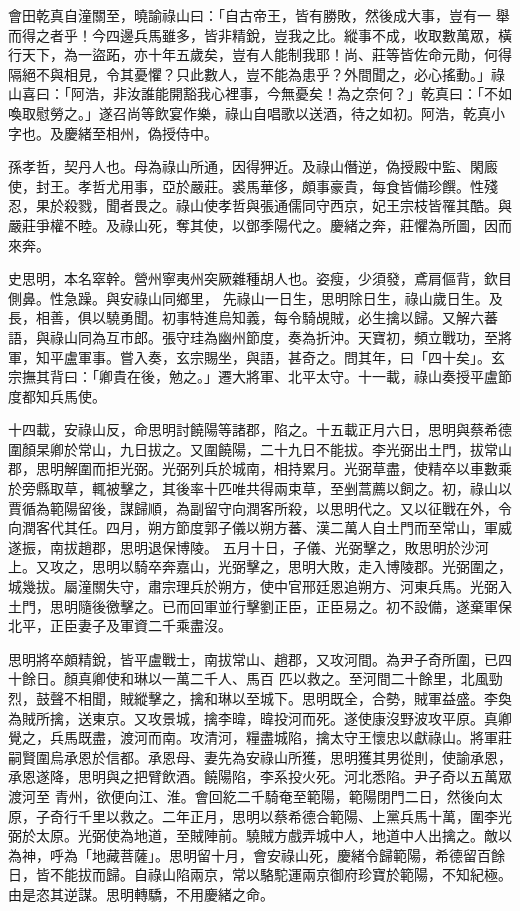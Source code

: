\begin{pinyinscope}
 會田乾真自潼關至，曉諭祿山曰：「自古帝王，皆有勝敗，然後成大事，豈有一
 舉而得之者乎！今四邊兵馬雖多，皆非精銳，豈我之比。縱事不成，收取數萬眾，橫行天下，為一盜跖，亦十年五歲矣，豈有人能制我耶！尚、莊等皆佐命元勛，何得隔絕不與相見，令其憂懼？只此數人，豈不能為患乎？外間聞之，必心搖動。」祿山喜曰：「阿浩，非汝誰能開豁我心裡事，今無憂矣！為之奈何？」乾真曰：「不如喚取慰勞之。」遂召尚等飲宴作樂，祿山自唱歌以送酒，待之如初。阿浩，乾真小字也。及慶緒至相州，偽授侍中。



 孫孝哲，契丹人也。母為祿山所通，因得狎近。及祿山僭逆，偽授殿中監、閑廄使，封王。孝哲尤用事，亞於嚴莊。裘馬華侈，頗事豪貴，每食皆備珍饌。性殘忍，果於殺戮，聞者畏之。祿山使孝哲與張通儒同守西京，妃王宗枝皆罹其酷。與嚴莊爭權不睦。及祿山死，奪其使，以鄧季陽代之。慶緒之奔，莊懼為所圖，因而來奔。



 史思明，本名窣幹。營州寧夷州突厥雜種胡人也。姿瘦，少須發，鳶肩傴背，欽目側鼻。性急躁。與安祿山同鄉里，
 先祿山一日生，思明除日生，祿山歲日生。及長，相善，俱以驍勇聞。初事特進烏知義，每令騎覘賊，必生擒以歸。又解六蕃語，與祿山同為互市郎。張守珪為幽州節度，奏為折沖。天寶初，頻立戰功，至將軍，知平盧軍事。嘗入奏，玄宗賜坐，與語，甚奇之。問其年，曰「四十矣」。玄宗撫其背曰：「卿貴在後，勉之。」遷大將軍、北平太守。十一載，祿山奏授平盧節度都知兵馬使。



 十四載，安祿山反，命思明討饒陽等諸郡，陷之。十五載正月六日，思明與蔡希德
 圍顏杲卿於常山，九日拔之。又圍饒陽，二十九日不能拔。李光弼出土門，拔常山郡，思明解圍而拒光弼。光弼列兵於城南，相持累月。光弼草盡，使精卒以車數乘於旁縣取草，輒被擊之，其後率十匹唯共得兩束草，至剉蒿薦以飼之。初，祿山以賈循為範陽留後，謀歸順，為副留守向潤客所殺，以思明代之。又以征戰在外，令向潤客代其任。四月，朔方節度郭子儀以朔方蕃、漢二萬人自土門而至常山，軍威遂振，南拔趙郡，思明退保博陵。
 五月十日，子儀、光弼擊之，敗思明於沙河上。又攻之，思明以騎卒奔嘉山，光弼擊之，思明大敗，走入博陵郡。光弼圍之，城幾拔。屬潼關失守，肅宗理兵於朔方，使中官邢廷恩追朔方、河東兵馬。光弼入土門，思明隨後徼擊之。已而回軍並行擊劉正臣，正臣易之。初不設備，遂棄軍保北平，正臣妻子及軍資二千乘盡沒。



 思明將卒頗精銳，皆平盧戰士，南拔常山、趙郡，又攻河間。為尹子奇所圍，已四十餘日。顏真卿使和琳以一萬二千人、馬百
 匹以救之。至河間二十餘里，北風勁烈，鼓聲不相聞，賊縱擊之，擒和琳以至城下。思明既全，合勢，賊軍益盛。李奐為賊所擒，送東京。又攻景城，擒李暐，暐投河而死。遂使康沒野波攻平原。真卿覺之，兵馬既盡，渡河而南。攻清河，糧盡城陷，擒太守王懷忠以獻祿山。將軍莊嗣賢圍烏承恩於信都。承恩母、妻先為安祿山所獲，思明獲其男從則，使諭承恩，承恩遂降，思明與之把臂飲酒。饒陽陷，李系投火死。河北悉陷。尹子奇以五萬眾渡河至
 青州，欲便向江、淮。會回紇二千騎奄至範陽，範陽閉門二日，然後向太原，子奇行千里以救之。二年正月，思明以蔡希德合範陽、上黨兵馬十萬，圍李光弼於太原。光弼使為地道，至賊陣前。驍賊方戲弄城中人，地道中人出擒之。敵以為神，呼為「地藏菩薩」。思明留十月，會安祿山死，慶緒令歸範陽，希德留百餘日，皆不能拔而歸。自祿山陷兩京，常以駱駝運兩京御府珍寶於範陽，不知紀極。由是恣其逆謀。思明轉驕，不用慶緒之命。




\end{pinyinscope}
